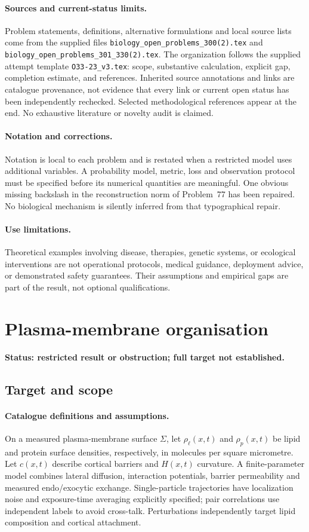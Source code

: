 \documentclass[11pt]{article}
\begin{document}
\paragraph{Sources and current-status limits.}
Problem statements, definitions, alternative formulations and local source lists
come from the supplied files
\texttt{biology\_open\_problems\_300(2).tex} and
\texttt{biology\_open\_problems\_301\_330(2).tex}.
The organization follows the supplied attempt template
\texttt{O33-23\_v3.tex}: scope, substantive calculation, explicit gap,
completion estimate, and references. Inherited source annotations and links are
catalogue provenance, not evidence that every link or current open status has
been independently rechecked. Selected methodological references appear at the
end. No exhaustive literature or novelty audit is claimed.

\paragraph{Notation and corrections.}
Notation is local to each problem and is restated when a restricted model uses
additional variables. A probability model, metric, loss and observation protocol
must be specified before its numerical quantities are meaningful. One obvious
missing backslash in the reconstruction norm of Problem~77 has been repaired.
No biological mechanism is silently inferred from that typographical repair.

\paragraph{Use limitations.}
Theoretical examples involving disease, therapies, genetic systems, or ecological
interventions are not operational protocols, medical guidance, deployment advice,
or demonstrated safety guarantees. Their assumptions and empirical gaps are part
of the result, not optional qualifications.


\section*{Plasma-membrane organisation}
\label{prob:014}
\noindent\textbf{Status: restricted result or obstruction; full target not established.}
\subsection{Target and scope}
\paragraph{Catalogue definitions and assumptions.}
On a measured plasma-membrane surface $\Sigma$, let $\rho_\ell(x,t)$ and $\rho_p(x,t)$ be lipid and protein surface densities, respectively, in molecules per square micrometre. Let $c(x,t)$ describe cortical barriers and $H(x,t)$ curvature. A finite-parameter model combines lateral diffusion, interaction potentials, barrier permeability and measured endo/exocytic exchange. Single-particle trajectories have localization noise and exposure-time averaging explicitly specified; pair correlations use independent labels to avoid cross-talk. Perturbations independently target lipid composition and cortical attachment.
\end{document}
